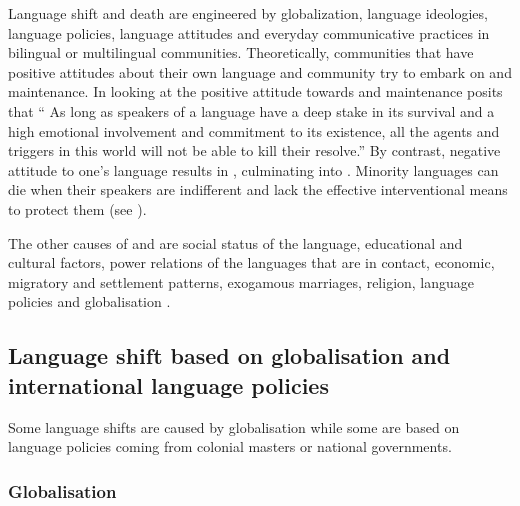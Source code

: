 \documentclass[output=paper,
modfonts
]{langscibook}
\begin{document}

Language shift and death are engineered by globalization, language ideologies, language policies, language attitudes and everyday communicative practices in bilingual or multilingual communities. Theoretically, communities that have positive attitudes about their own language and community try to embark on  and maintenance. In looking at the positive attitude towards  and maintenance \citet[307]{Adegbija2001} posits that “ As long as speakers of a language have a deep stake in its survival and a high emotional involvement and commitment to its existence, all the  agents and triggers in this world will not be able to kill their resolve.” By contrast, negative attitude to one’s language results in , culminating into . Minority languages can die when their speakers are indifferent and lack the effective interventional means to protect them (see \citealt[249]{Derhemi2002a}). 

The other  causes of  and  are social status of the language, educational and cultural factors, power relations of the languages that are in contact, economic, migratory and settlement patterns, exogamous marriages, religion, language policies and globalisation \citep[5--6]{Austin2011}.


\subsection{Language shift based on globalisation and international language policies}

Some language shifts are caused by globalisation while some are based on language policies coming from colonial masters or national governments.

\subsubsection{Globalisation}
\end{document}
